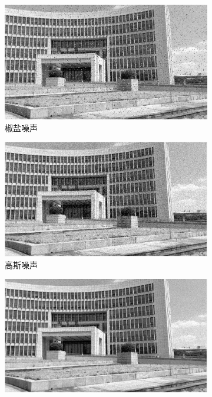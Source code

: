 \documentclass{article}
\newcounter{sub}
\begin{document}
\begin{figure}[htpb]
	\centering
	\begin{subfigure}[htpb]{.45\linewidth}
		\centering
		\includegraphics[width=\linewidth]{salt.png}
		\caption{椒盐噪声}
		\label{fig:椒盐噪声}
	\end{subfigure}
	\quad
	\begin{subfigure}[htpb]{.45\linewidth}
		\centering
		\includegraphics[width=\linewidth]{Gauss.png}
		\caption{高斯噪声}
		\label{fig:高斯噪声}
	\end{subfigure}
	\quad
	\begin{subfigure}[htpb]{.45\linewidth}
		\centering
		\includegraphics[width=\linewidth]{Possion.png}

\end{subfigure}
\end{figure}
\end{document}
